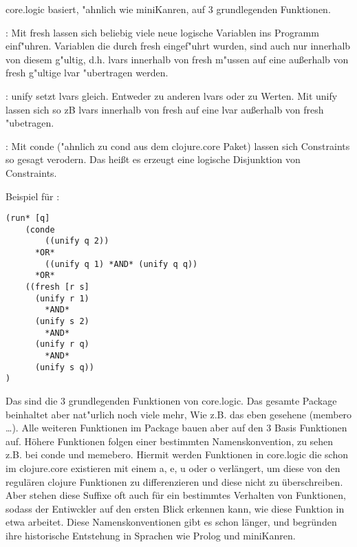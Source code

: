 core.logic basiert, "ahnlich wie miniKanren, auf 3 grundlegenden Funktionen.
\begin{description}
\item{:}
Mit fresh lassen sich beliebig viele neue logische Variablen ins Programm einf"uhren. Variablen die durch fresh eingef"uhrt wurden, sind auch nur innerhalb von diesem g"ultig, d.h. lvars innerhalb von fresh m"ussen auf eine au\ss{}erhalb von fresh g"ultige lvar "ubertragen werden.

\item{:}
unify setzt lvars gleich. Entweder zu anderen lvars oder zu Werten. Mit unify lassen sich so zB lvars innerhalb von fresh auf eine lvar au\ss{}erhalb von fresh "ubetragen.

\item{:}
Mit conde ("ahnlich zu cond aus dem clojure.core Paket) lassen sich Constraints so gesagt \dq{}verodern\dq{}. Das heißt es erzeugt eine logische Disjunktion von Constraints.
\end{description}
Beispiel für :
\begin{lstlisting}
(run* [q]
    (conde
        ((unify q 2))
	  *OR*
        ((unify q 1) *AND* (unify q q))
	  *OR*
	((fresh [r s] 
	  (unify r 1)
	    *AND*
	  (unify s 2)
	    *AND*
	  (unify r q)
	    *AND*
	  (unify s q))
)
\end{lstlisting}
Das sind die 3 grundlegenden Funktionen von core.logic. Das gesamte Package beinhaltet aber nat"urlich noch viele mehr, Wie z.B. das eben gesehene (membero \dots{}). Alle weiteren Funktionen im Package bauen aber auf den 3 Basis Funktionen auf. Höhere Funktionen folgen einer bestimmten Namenskonvention, zu sehen z.B. bei conde und memebero. Hiermit werden Funktionen in core.logic die schon im clojure.core existieren mit einem a, e, u oder o \dq{}verlängert\dq{}, um diese von den regulären clojure Funktionen zu differenzieren und diese nicht zu überschreiben. Aber stehen diese Suffixe oft auch für ein bestimmtes Verhalten von Funktionen, sodass der Entiwckler auf den ersten Blick erkennen kann, wie diese Funktion in etwa arbeitet. Diese Namenskonventionen gibt es schon länger, und begründen ihre historische Entstehung in Sprachen wie Prolog und miniKanren.

